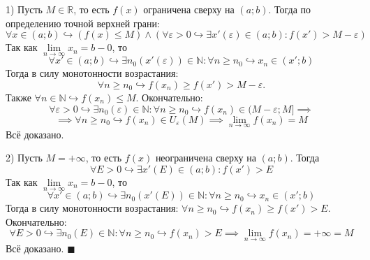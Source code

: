 \documentclass[12pt, a4paper, reqno]{article}
\begin{document}
    1) Пусть $M\in\mathbb{R}$, то есть $f(x)$ ограничена сверху на $(a; b)$. Тогда по определению
    точной верхней грани:
    \begin{equation*}
        \forall x\in (a; b)\hookrightarrow (f(x)\leq M)\wedge(\forall\varepsilon > 0 \hookrightarrow
        \exists x'(\varepsilon)\in(a; b): f(x') > M - \varepsilon)
    \end{equation*}
    Так как $\lim\limits_{n\to\infty} x_n = b - 0$, то
    \begin{equation*}
        \forall x'\in(a; b)\hookrightarrow \exists n_0(x'(\varepsilon))\in\mathbb{N}: \forall n \geq
        n_0 \hookrightarrow x_n\in (x'; b)
    \end{equation*}
    Тогда в силу монотонности возрастания:
    \begin{equation*}
        \forall n \geq n_0\hookrightarrow f(x_n) \geq f(x') > M - \varepsilon.
    \end{equation*}
    Также $\forall n\in\mathbb{N}\hookrightarrow f(x_n)\leq M$. Окончательно:
    \begin{equation*}
        \forall\varepsilon > 0\hookrightarrow\exists n_0(\varepsilon)\in\mathbb{N}: \forall n \geq
        n_0\hookrightarrow f(x_n) \in (M - \varepsilon; M] \implies
    \end{equation*}
    \begin{equation*}
        \implies \forall n \geq n_0\hookrightarrow f(x_n)\in U_{\varepsilon}(M) \implies
        \lim\limits_{n\to\infty} f(x_n) = M
    \end{equation*}
    Всё доказано.

    2) Пусть $M = +\infty$, то есть $f(x)$ неограничена сверху на $(a; b)$. Тогда
    \begin{equation*}
        \forall E > 0 \hookrightarrow\exists x'(E)\in(a; b): f(x') > E
    \end{equation*}
    Так как $\lim\limits_{n\to\infty} x_n = b - 0$, то
    \begin{equation*}
        \forall x'\in(a; b)\hookrightarrow \exists n_0(x'(E))\in\mathbb{N}: \forall n \geq n_0
        \hookrightarrow x_n\in (x'; b)
    \end{equation*}
    Тогда в силу монотонности возрастания: $\forall n \geq n_0 \hookrightarrow f(x_n) \geq f(x')>
    E$. Окончательно:
    \begin{equation*}
        \forall E > 0\hookrightarrow\exists n_0(E)\in\mathbb{N}: \forall n \geq n_0 \hookrightarrow
        f(x_n) > E \implies \lim\limits_{n\to\infty} f(x_n) = +\infty = M
    \end{equation*}
    Всё доказано. $\blacksquare$
\end{document}
